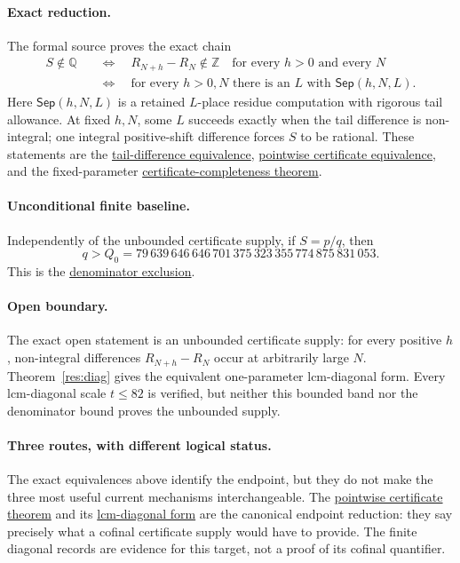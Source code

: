 \documentclass[11pt]{article}
\newcommand{\commit}{99f4bf47422abbd8757cbb22b50ba079d764d3a7}
\newcommand{\repobase}{https://github.com/wcook04/plectis-erdos/blob/\commit}
\newcommand{\PK}{Erdos249257}
\newcommand{\lword}[4]{\href{\repobase/\PK/#1\#L#2}{#4}}
\theoremstyle{definition}
\theoremstyle{remark}
\newcommand{\Z}{\mathbb{Z}}
\newcommand{\Q}{\mathbb{Q}}
\newcommand{\Qzero}{Q_0}
\begin{document}
\paragraph{Exact reduction.}
The formal source proves the exact chain
\[
\begin{split}
 S\notin\Q
 &\quad\Longleftrightarrow\quad
   R_{N+h}-R_N\notin\Z
   \quad\text{for every }h>0\text{ and every }N\\
 &\quad\Longleftrightarrow\quad
   \text{for every }h>0,N\text{ there is an }L
   \text{ with }\mathsf{Sep}(h,N,L).
\end{split}
\]
Here \(\mathsf{Sep}(h,N,L)\) is a retained \(L\)-place residue computation
with rigorous tail allowance.  At fixed \(h,N\), some \(L\) succeeds exactly
when the tail difference is non-integral; one integral positive-shift
difference forces \(S\) to be rational.  These statements are the
\lword{LcmConeFlatness.lean}{386}{irrational_totient_series_iff_all_tail_diffs_nonintegral}{tail-difference equivalence},
\lword{LcmConeFlatness.lean}{399}{irrational_totient_series_iff_pointwise_certificates}{pointwise certificate equivalence},
and the fixed-parameter
\lword{LcmConeFlatness.lean}{316}{exists_certifiedKill_iff_tail_diff_notMem_int}{certificate-completeness theorem}.

\paragraph{Unconditional finite baseline.}
Independently of the unbounded certificate supply, if \(S=p/q\), then
\[
 q>\Qzero
 =79\,639\,646\,646\,701\,375\,323\,355\,774\,875\,831\,053.
\]
This is the \lword{CertificateKernel.lean}{18384}{tsum_totient_div_pow_two_ne_ratCast_of_den_le_79639646646701375323355774875831053}{denominator exclusion}.

\paragraph{Open boundary.}
The exact open statement is an unbounded certificate supply: for every
positive \(h\), non-integral differences \(R_{N+h}-R_N\) occur at
arbitrarily large \(N\).  Theorem~\ref{res:diag} gives the equivalent
one-parameter lcm-diagonal form.  Every lcm-diagonal scale \(t\le82\) is
verified, but neither this bounded band nor the denominator bound proves the
unbounded supply.

\paragraph{Three routes, with different logical status.}
The exact equivalences above identify the endpoint, but they do not make the
three most useful current mechanisms interchangeable.  The
\lword{LcmConeFlatness.lean}{399}{irrational_totient_series_iff_pointwise_certificates}{pointwise certificate theorem}
and its
\lword{LcmConeFlatness.lean}{426}{irrational_totient_series_iff_lcm_diagonal_certificate_supply}{lcm-diagonal form}
are the canonical endpoint reduction: they say precisely what a cofinal
certificate supply would have to provide.  The finite diagonal records are
evidence for this target, not a proof of its cofinal quantifier.
\end{document}
